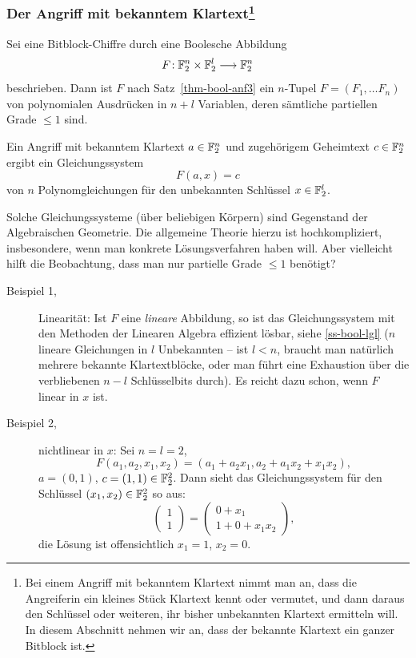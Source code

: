 \begin{refsegment}
\subsubsection*{Der Angriff mit bekanntem
  Klartext\footnote{%
  Bei einem Angriff mit bekanntem Klartext nimmt man an, dass die
  Angreiferin ein kleines Stück Klartext kennt oder vermutet,
  und dann daraus den Schlüssel oder weiteren, ihr bisher
  unbekannten Klartext ermitteln will. In diesem Abschnitt nehmen
  wir an, dass der bekannte Klartext ein ganzer Bitblock ist.}}

Sei eine Bitblock-Chiffre durch eine
Boolesche Abbildung
\[
  F\!: \mathbb{F}_2^n \times \mathbb{F}_2^l \longrightarrow \mathbb{F}_2^n
\]
beschrieben. Dann ist $F$ nach Satz~\ref{thm-bool-anf3} ein $n$-Tupel
$F = (F_1, \ldots F_n)$ von polynomialen Ausdrücken in $n+l$ Variablen, deren
sämtliche partiellen Grade $\leq 1$ sind.

Ein Angriff mit bekanntem Klartext $a \in \mathbb{F}_2^n$ und zugehörigem
Geheimtext $c \in \mathbb{F}_2^n$ ergibt ein Gleichungssystem
\[
    F(a,x) = c
\]
von $n$ Polynomgleichungen für den unbekannten
Schlüssel $x \in \mathbb{F}_2^l$.

Solche Gleichungssysteme (über beliebigen Körpern)
sind Gegenstand der Algebraischen Geometrie.
Die allgemeine Theorie hierzu ist hochkompliziert, insbesondere, wenn man
konkrete Lösungsverfahren haben will.
Aber vielleicht hilft die Beobachtung, dass man nur
partielle Grade
$\leq 1$ benötigt?

\begin{description}
\item[Beispiel 1,] Linearität: Ist $F$ eine {\em lineare}
Abbildung,
so ist das Gleichungssystem mit den Methoden der
Linearen Algebra effizient
lösbar, siehe \ref{ss-bool-lgl} ($n$ lineare Gleichungen in $l$ Unbekannten
-- ist $l < n$, braucht man natürlich mehrere bekannte Klartextblöcke, oder
man führt eine Exhaustion über die verbliebenen $n - l$ Schlüsselbits
durch). Es reicht dazu schon, wenn $F$ linear in $x$ ist.

\item[Beispiel 2,] nichtlinear in $x$: Sei $n = l = 2$,
\[
    F(a_1,a_2,x_1,x_2) = (a_1+a_2x_1, a_2+a_1x_2+x_1x_2),
\]
   $a = (0,1)$, $c = (1,1) \in \mathbb{F}_2^2$. Dann sieht das Gleichungssystem
   für den Schlüssel $(x_1,x_2) \in \mathbb{F}_2^2$ so aus:
\[
   \begin{pmatrix} 1 \\ 1 \end{pmatrix} =
   \begin{pmatrix} 0+x_1 \\ 1+0+x_1x_2 \end{pmatrix},
\]
   die Lösung ist offensichtlich $x_1 = 1$, $x_2 = 0$.


\end{description}
\end{refsegment}

